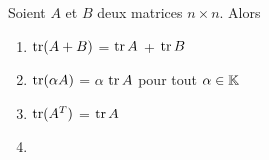 
\begin{frame}
\begin{theoreme}
Soient $A$ et $B$ deux matrices $n \times n$. Alors 
\begin{enumerate}
\item $\tr(A + B)$ = $\tr A$ + $\tr B$
\item $\tr(\alpha A)$ = $\alpha$ $\tr A$ pour tout $\alpha \in \Kk$
\item $\tr(A^T)$ = $\tr A $
\item {}
\end{enumerate}
\end{theoreme}


\end{frame}
